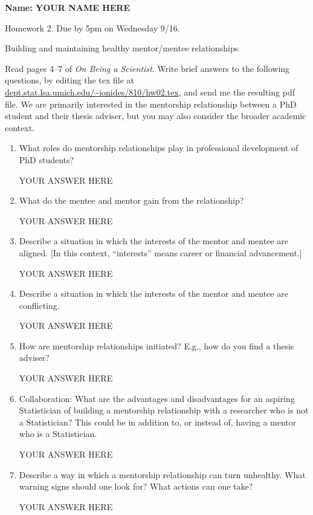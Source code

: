 \documentclass[12pt]{article}
\begin{document}
\begin{center}\bf
Name: YOUR NAME HERE

Homework 2. Due by 5pm on Wednesday 9/16.

Building and maintaining healthy mentor/mentee relationships

\end{center}

Read pages 4--7 of {\em On Being a Scientist}. Write brief answers to the following questions, by editing the tex file at \url{dept.stat.lsa.umich.edu/~ionides/810/hw02.tex}, and send me the resulting pdf file. We are primarily interested in the mentorship relationship between a PhD student and their thesis adviser, but you may also consider the broader academic context.

\begin{enumerate}
\item What roles do mentorship relationships play in professional development of PhD students? 

YOUR ANSWER HERE

\item What do the mentee and mentor gain from the relationship?

YOUR ANSWER HERE

\item Describe a situation in which the interests of the mentor and mentee are aligned. [In this context, ``interests'' means career or financial advancement.]

YOUR ANSWER HERE

\item Describe a situation in which the interests of the mentor and mentee are conflicting. 

YOUR ANSWER HERE

\item How are mentorship relationships initiated? E.g., how do you find a thesis adviser?

YOUR ANSWER HERE

\item Collaboration: What are the advantages and disadvantages for an aspiring Statistician of building a mentorship relationship with a researcher who is not a Statistician? This could be in addition to, or instead of, having a mentor who is a Statistician.

YOUR ANSWER HERE

\item Describe a way in which a mentorship relationship can turn unhealthy. What warning signs should one look for? What actions can one take?

YOUR ANSWER HERE

\end{enumerate}
\end{document}
